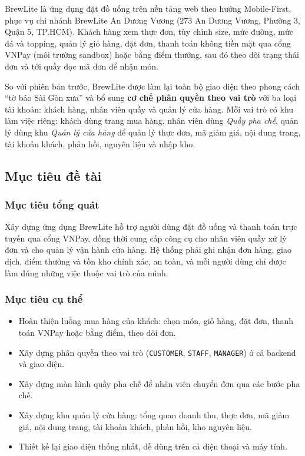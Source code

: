 \documentclass[12pt,a4paper]{article}
\begin{document}
BrewLite là ứng dụng đặt đồ uống trên nền tảng web theo hướng Mobile-First, phục vụ chi nhánh BrewLite An Dương Vương (273 An Dương Vương, Phường 3, Quận 5, TP.HCM). Khách hàng xem thực đơn, tùy chỉnh size, mức đường, mức đá và topping, quản lý giỏ hàng, đặt đơn, thanh toán không tiền mặt qua cổng VNPay (môi trường sandbox) hoặc bằng điểm thưởng, sau đó theo dõi trạng thái đơn và tới quầy đọc mã đơn để nhận món.

So với phiên bản trước, BrewLite được làm lại toàn bộ giao diện theo phong cách ``tờ báo Sài Gòn xưa'' và bổ sung \textbf{cơ chế phân quyền theo vai trò} với ba loại tài khoản: khách hàng, nhân viên quầy và quản lý cửa hàng. Mỗi vai trò có khu làm việc riêng: khách dùng trang mua hàng, nhân viên dùng \textit{Quầy pha chế}, quản lý dùng khu \textit{Quản lý cửa hàng} để quản lý thực đơn, mã giảm giá, nội dung trang, tài khoản khách, phản hồi, nguyên liệu và nhập kho.

\subsection{Mục tiêu đề tài}
\subsubsection{Mục tiêu tổng quát}
Xây dựng ứng dụng BrewLite hỗ trợ người dùng đặt đồ uống và thanh toán trực tuyến qua cổng VNPay, đồng thời cung cấp công cụ cho nhân viên quầy xử lý đơn và cho quản lý vận hành cửa hàng. Hệ thống phải ghi nhận đơn hàng, giao dịch, điểm thưởng và tồn kho chính xác, an toàn, và mỗi người dùng chỉ được làm đúng những việc thuộc vai trò của mình.

\subsubsection{Mục tiêu cụ thể}
\begin{itemize}
  \item Hoàn thiện luồng mua hàng của khách: chọn món, giỏ hàng, đặt đơn, thanh toán VNPay hoặc bằng điểm, theo dõi đơn.
  \item Xây dựng phân quyền theo vai trò (\texttt{CUSTOMER}, \texttt{STAFF}, \texttt{MANAGER}) ở cả backend và giao diện.
  \item Xây dựng màn hình quầy pha chế để nhân viên chuyển đơn qua các bước pha chế.
  \item Xây dựng khu quản lý cửa hàng: tổng quan doanh thu, thực đơn, mã giảm giá, nội dung trang, tài khoản khách, phản hồi, kho nguyên liệu.
  \item Thiết kế lại giao diện thống nhất, dễ dùng trên cả điện thoại và máy tính.
\end{itemize}
\end{document}
